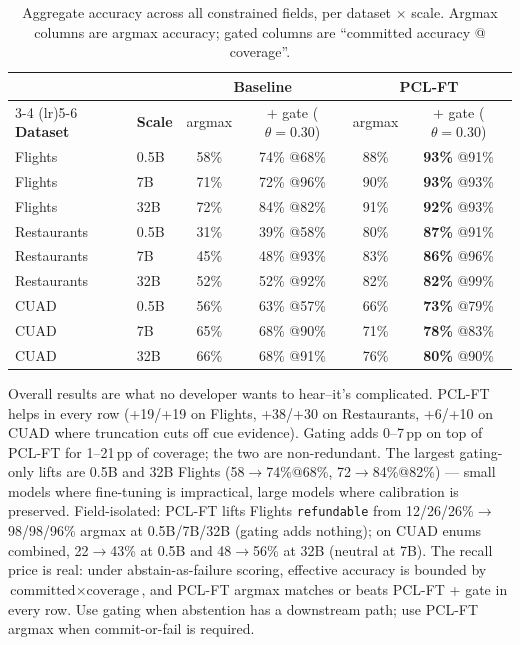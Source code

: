 \documentclass{article}
\begin{document}
\begin{table}[t]
\centering
\small
\begin{tabular}{llcccc}
\toprule
 &  & \multicolumn{2}{c}{\textbf{Baseline}} & \multicolumn{2}{c}{\textbf{PCL-FT}} \\
\cmidrule(lr){3-4} \cmidrule(lr){5-6}
\textbf{Dataset} & \textbf{Scale} & argmax & + gate ($\theta{=}0.30$) & argmax & + gate ($\theta{=}0.30$) \\
\midrule
Flights     & 0.5B & 58\% & 74\% @68\% & 88\% & \textbf{93\%} @91\% \\
Flights     & 7B   & 71\% & 72\% @96\% & 90\% & \textbf{93\%} @93\% \\
Flights     & 32B  & 72\% & 84\% @82\% & 91\% & \textbf{92\%} @93\% \\
\midrule
Restaurants & 0.5B & 31\% & 39\% @58\% & 80\% & \textbf{87\%} @91\% \\
Restaurants & 7B   & 45\% & 48\% @93\% & 83\% & \textbf{86\%} @96\% \\
Restaurants & 32B  & 52\% & 52\% @92\% & 82\% & \textbf{82\%} @99\% \\
\midrule
CUAD        & 0.5B & 56\% & 63\% @57\% & 66\% & \textbf{73\%} @79\% \\
CUAD        & 7B   & 65\% & 68\% @90\% & 71\% & \textbf{78\%} @83\% \\
CUAD        & 32B  & 66\% & 68\% @91\% & 76\% & \textbf{80\%} @90\% \\
\bottomrule
\end{tabular}
\caption{Aggregate accuracy across all constrained fields, per dataset $\times$ scale. Argmax columns are argmax accuracy; gated columns are ``committed accuracy @ coverage''.}
\label{tab:head_to_head}
\end{table}

Overall results are what no developer wants to hear--it's complicated. PCL-FT helps in every row (+19/+19 on Flights, +38/+30 on Restaurants, +6/+10 on CUAD where truncation cuts off cue evidence). Gating adds 0--7\,pp on top of PCL-FT for 1--21\,pp of coverage; the two are non-redundant. The largest gating-only lifts are 0.5B and 32B Flights (58$\rightarrow$74\%@68\%, 72$\rightarrow$84\%@82\%) --- small models where fine-tuning is impractical, large models where calibration is preserved. Field-isolated: PCL-FT lifts Flights \texttt{refundable} from 12/26/26\%$\rightarrow$98/98/96\% argmax at 0.5B/7B/32B (gating adds nothing); on CUAD enums combined, 22$\rightarrow$43\% at 0.5B and 48$\rightarrow$56\% at 32B (neutral at 7B). The recall price is real: under abstain-as-failure scoring, effective accuracy is bounded by $\text{committed} \times \text{coverage}$, and PCL-FT argmax matches or beats PCL-FT + gate in every row. Use gating when abstention has a downstream path; use PCL-FT argmax when commit-or-fail is required.
\end{document}
